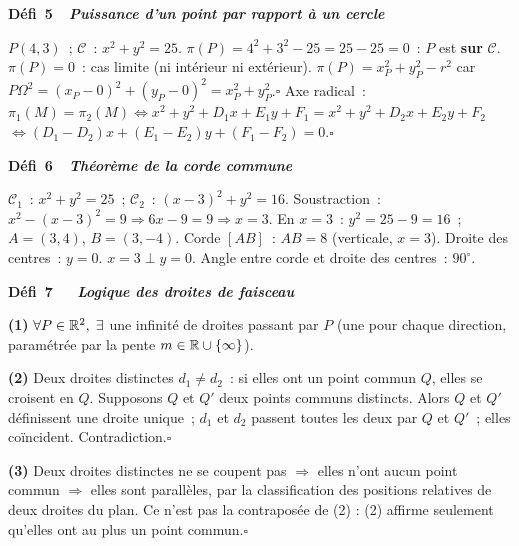 \noindent{}
{\color{BO}\bfseries\small D\'efi~5~\textendash\ \textit{Puissance d'un point par rapport \`a un cercle}}
\par\smallskip

$P(4,3)$~; $\mathcal{C}$~: $x^2+y^2=25$.
$\pi(P)=4^2+3^2-25=25-25=0$~: $P$ est \textbf{sur} $\mathcal{C}$.\checkmark
$\pi(P)=0$~: cas limite (ni int\'erieur ni ext\'erieur).
$\pi(P)=x_P^2+y_P^2-r^2$ car $P\Omega^2=(x_P-0)^2+(y_P-0)^2=x_P^2+y_P^2$.\hfill$\square$
Axe radical~: $\pi_1(M)=\pi_2(M)\Leftrightarrow x^2+y^2+D_1x+E_1y+F_1=x^2+y^2+D_2x+E_2y+F_2$
$\Leftrightarrow(D_1-D_2)x+(E_1-E_2)y+(F_1-F_2)=0$.\hfill$\square$

\noindent{}
{\color{BO}\bfseries\small D\'efi~6~\textendash\ \textit{Th\'eor\`eme de la corde commune}}
\par\smallskip

$\mathcal{C}_1$~: $x^2+y^2=25$~; $\mathcal{C}_2$~: $(x-3)^2+y^2=16$.
Soustraction~: $x^2-(x-3)^2=9\Rightarrow6x-9=9\Rightarrow x=3$.
En $x=3$~: $y^2=25-9=16$~; $A=(3,4)$, $B=(3,-4)$.
Corde $[AB]$~: $AB=8$ (verticale, $x=3$).
Droite des centres~: $y=0$.
$x=3\perp y=0$.\checkmark
Angle entre corde et droite des centres~: $90^{\circ}$.

\noindent{}
{\color{BO}\bfseries\small D\'efi~7~\textendash\ \textit{\logiq\ Logique des droites de faisceau}}
\par\smallskip

\textbf{(1)} $\forall P\in\mathbb{R}^2,\;\exists$ une infinit\'e de droites passant par $P$
(une pour chaque direction, param\'etr\'ee par la pente $m\in\mathbb{R}\cup\{\infty\}$).

\textbf{(2)} Deux droites distinctes $d_1\ne d_2$~: si elles ont un point commun $Q$,
elles se croisent en $Q$. Supposons $Q$ et $Q'$ deux points communs distincts.
Alors $Q$ et $Q'$ d\'efinissent une droite unique~; $d_1$ et $d_2$ passent toutes les deux
par $Q$ et $Q'$~; elles co\"incident. Contradiction.\hfill$\square$

\textbf{(3)} Deux droites distinctes ne se coupent pas $\Rightarrow$ elles n'ont aucun point commun
$\Rightarrow$ elles sont parall\`eles, par la classification des positions
relatives de deux droites du plan. Ce n'est pas la contrapos\'ee de (2) :
(2) affirme seulement qu'elles ont au plus un point commun.\hfill$\square$

